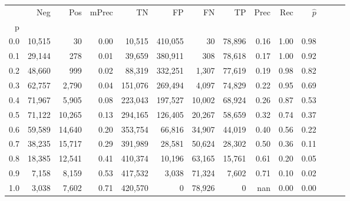 \begin{tabular}{rrrrrrrrrrrrrr}
\toprule
{} &     Neg &     Pos & mPrec &       TN &       FP &      FN &      TP &  Prec &   Rec & $\hat{p}$ \\
p   &         &         &       &          &          &         &         &       &       &           \\
\midrule
0.0 &  10,515 &      30 &  0.00 &   10,515 &  410,055 &      30 &  78,896 &  0.16 &  1.00 &      0.98 \\
0.1 &  29,144 &     278 &  0.01 &   39,659 &  380,911 &     308 &  78,618 &  0.17 &  1.00 &      0.92 \\
0.2 &  48,660 &     999 &  0.02 &   88,319 &  332,251 &   1,307 &  77,619 &  0.19 &  0.98 &      0.82 \\
0.3 &  62,757 &   2,790 &  0.04 &  151,076 &  269,494 &   4,097 &  74,829 &  0.22 &  0.95 &      0.69 \\
0.4 &  71,967 &   5,905 &  0.08 &  223,043 &  197,527 &  10,002 &  68,924 &  0.26 &  0.87 &      0.53 \\
0.5 &  71,122 &  10,265 &  0.13 &  294,165 &  126,405 &  20,267 &  58,659 &  0.32 &  0.74 &      0.37 \\
0.6 &  59,589 &  14,640 &  0.20 &  353,754 &   66,816 &  34,907 &  44,019 &  0.40 &  0.56 &      0.22 \\
0.7 &  38,235 &  15,717 &  0.29 &  391,989 &   28,581 &  50,624 &  28,302 &  0.50 &  0.36 &      0.11 \\
0.8 &  18,385 &  12,541 &  0.41 &  410,374 &   10,196 &  63,165 &  15,761 &  0.61 &  0.20 &      0.05 \\
0.9 &   7,158 &   8,159 &  0.53 &  417,532 &    3,038 &  71,324 &   7,602 &  0.71 &  0.10 &      0.02 \\
1.0 &   3,038 &   7,602 &  0.71 &  420,570 &        0 &  78,926 &       0 &   nan &  0.00 &      0.00 \\
\bottomrule
\end{tabular}
